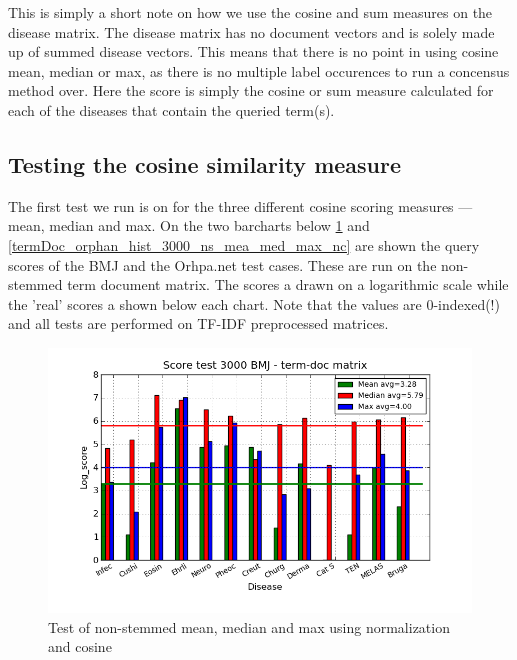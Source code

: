 This is simply a short note on how we use the cosine and sum measures
on the disease matrix. The disease matrix has no document vectors and
is solely made up of summed disease vectors. This means that there is
no point in using cosine mean, median or max, as there is no multiple
label occurences to run a concensus method over. Here the score is
simply the cosine or sum measure calculated for each of the diseases
that contain the queried term(s).

\subsection{Testing the cosine similarity measure\label{TestingCosineSimilarity}}

The first test we run is on for the three different cosine scoring measures --- mean, median and max. On the two barcharts below \ref{termDoc_bmj_hist_3000_ns_mea_med_max_nc} and \ref{termDoc_orphan_hist_3000_ns_mea_med_max_nc} are shown the query scores of the BMJ and the Orhpa.net test cases. These are run on the non-stemmed term document matrix. The scores a drawn on a logarithmic scale while the 'real' scores a shown below each chart. Note that the values are 0-indexed(!) and all tests are performed on TF-IDF preprocessed matrices. \\

\begin{figure}[!h]
        \begin{center}
          \includegraphics[width=1.0\textwidth]{barcharts/termDoc_bmj_hist_3000_ns_mea_med_max_nc.png}
        \end{center}
        \caption{Test of non-stemmed mean, median and max using normalization and cosine}
        \label{termDoc_bmj_hist_3000_ns_mea_med_max_nc}
\end{figure}


